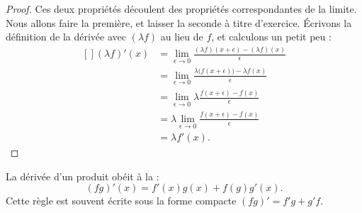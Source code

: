\begin{proof}
Ces deux propriétés découlent des propriétés correspondantes de la limite. Nous allons faire la première, et laisser la seconde à titre d'exercice. Écrivons la définition de la dérivée avec $(\lambda f)$ au lieu de $f$, et calculons un petit peu :
\begin{equation}
    \begin{aligned}[]
        (\lambda f)'(x) &=\lim_{\epsilon\to 0}\frac{ (\lambda f)(x+\epsilon)-(\lambda f)(x) }{ \epsilon }\\
                &=\lim_{\epsilon\to 0}\frac{ \lambda \big( f(x+\epsilon) \big)-\lambda f(x) }{ \epsilon }\\
                &=\lim_{\epsilon\to 0}\lambda \frac{ f(x+\epsilon) -f(x) }{ \epsilon }\\
                &=\lambda \lim_{\epsilon\to 0}\frac{ f(x+\epsilon) -f(x) }{ \epsilon }\\
                &=\lambda f'(x).
    \end{aligned}
\end{equation}
\end{proof}


\begin{proposition}
    La dérivée d'un produit obéit à la :
    \begin{equation}
        (fg)'(x)=f'(x)g(x)+f(g)g'(x).
    \end{equation}
    Cette règle est souvent écrite sous la forme compacte $(fg)'=f'g+g'f$.
\end{proposition}

